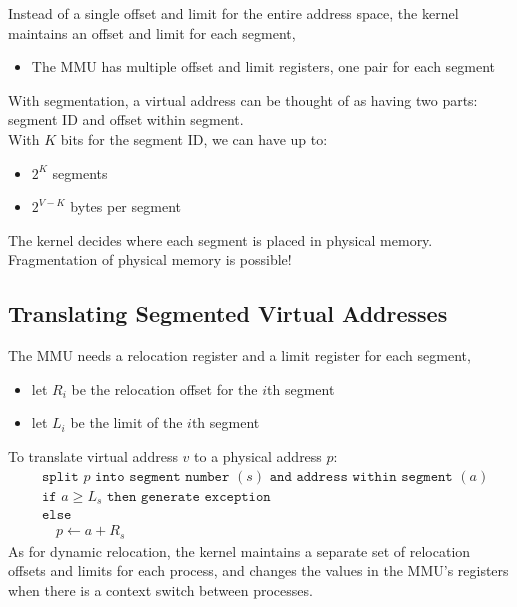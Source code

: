 \documentclass[12pt]{article}
\theoremstyle{plain}
\theoremstyle{definition}
\begin{document}
Instead of a single offset and limit for the entire address space, the kernel maintains an offset and limit for each segment,
\begin{itemize}
  \item The MMU has multiple offset and limit registers, one pair for each segment
\end{itemize}

With segmentation, a virtual address can be thought of as having two parts: segment ID and offset within segment. \\

With $K$ bits for the segment ID, we can have up to:
\begin{itemize}
  \item $2^{K}$ segments
  \item $2^{V - K}$ bytes per segment
\end{itemize}

The kernel decides where each segment is placed in physical memory.
Fragmentation of physical memory is possible!

\subsection{Translating Segmented Virtual Addresses}
The MMU needs a relocation register and a limit register for each segment,
\begin{itemize}
  \item let $R_{i}$ be the relocation offset for the $i$th segment
  \item let $L_{i}$ be the limit of the $i$th segment
\end{itemize}
To translate virtual address $v$ to a physical address $p$:
\begin{align*}
&\texttt{split } p \texttt{ into segment number }(s)\texttt{ and address within segment }(a) \\
&\texttt{if } a \geq L_{s} \texttt{ then generate exception} \\
&\texttt{else} \\
&\quad p \gets a + R_{s}
\end{align*}
As for dynamic relocation, the kernel maintains a separate set of relocation offsets and limits for each process, and changes the values in the MMU's registers when there is a context switch between processes.
\end{document}
